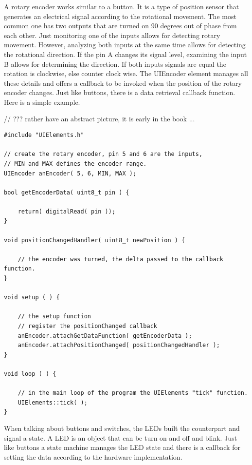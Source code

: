 
A rotary encoder works similar to a button. It is a type of position sensor that generates an electrical signal according to the rotational movement. The most common one has two outputs that are turned on 90 degrees out of phase from each other. Just monitoring one of the inputs allows for detecting rotary movement. However, analyzing both inputs at the same time allows for detecting the rotational direction. If the pin A changes its signal level, examining the input B allows for determining the direction. If both inputs signals are equal the rotation is clockwise, else counter clock wise. The UIEncoder element manages all these details and offers a callback to be invoked when the position of the rotary encoder changes. Just like buttons, there is a data retrieval callback function. Here is a simple example.

// ??? rather have an abstract picture, it is early in the book ...


\lstset{language=c++, style=codesnippetstyle}
\begin{lstlisting}
#include "UIElements.h"

// create the rotary encoder, pin 5 and 6 are the inputs, 
// MIN and MAX defines the encoder range.
UIEncoder anEncoder( 5, 6, MIN, MAX );

bool getEncoderData( uint8_t pin ) {

	return( digitalRead( pin ));
}

void positionChangedHandler( uint8_t newPosition ) {

	// the encoder was turned, the delta passed to the callback function.
}

void setup ( ) {
	
	// the setup function 
	// register the positionChanged callback
	anEncoder.attachGetDataFunction( getEncoderData );
    anEncoder.attachPositionChanged( positionChangedHandler );
}

void loop ( ) {

    // in the main loop of the program the UIElements "tick" function.
	UIElements::tick( );
}
\end{lstlisting}
\FloatBarrier


When talking about buttons and switches, the LEDs built the counterpart and signal a state. A LED is an object that can be turn on and off and blink. Just like buttons a state machine manages the LED state and there is a callback for setting the data according to the hardware implementation.

